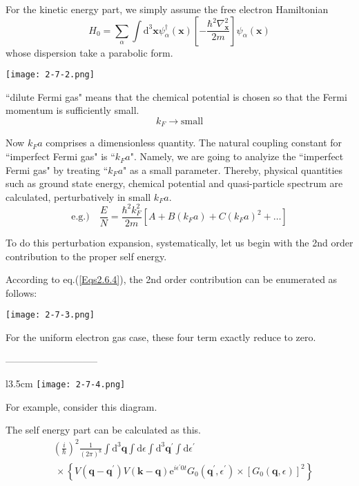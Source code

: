 For the kinetic energy part, we simply assume the free electron Hamiltonian
\[H_0 = \sum_\alpha \int \mathrm{d}^3 \mathbf{x} \psi_\alpha^\dagger (\mathbf{x}) \left[-\frac{\hbar^2\nabla^2_{\mathbf{x}}}{2m}\right]\psi_\alpha(\mathbf{x})\]
whose dispersion take a parabolic form.
\begin{center} \label{Fig2.7.2} \texttt{[image: 2-7-2.png]} \end{center}

``dilute Fermi gas" means that the chemical potential is chosen so that the Fermi momentum is sufficiently small. $$k_F \rightarrow \text{small}$$

Now $k_F a$ comprises a dimensionless quantity. The natural coupling constant for ``imperfect Fermi gas" is ``$k_F a$". Namely, we are going to analyize the ``imperfect Fermi gas" by treating ``$k_F a$" as a small parameter. Thereby, physical quantities such as ground state energy, chemical potential and quasi-particle spectrum are calculated, perturbatively in small $k_F a$.
\[ \text{e.g.)} \quad \frac{E}{N} = \frac{\hbar^2 k_F^2}{2m} \left[ A + B(k_F a) + C{(k_F a)}^2 + \ldots \right] \]

To do this perturbation expansion, systematically, let us begin with the 2nd order contribution to the proper self energy.

According to eq.(\ref{Eqs2.6.4}), the 2nd order contribution can be enumerated as follows:
\begin{center}\label{Fig2.7.3} \texttt{[image: 2-7-3.png]} \end{center}

For the uniform electron gas case, these four term exactly reduce to zero.
\begin{center}-----------------------------\end{center}

\begin{wrapfigure}{l}{3.5cm}
\label{Fig2.7.4} \texttt{[image: 2-7-4.png]}
\end{wrapfigure}
For example, consider this diagram.

The self energy part can be calculated as this.
\[ \begin{split} & {\left(\frac{i}{\hbar} \right)}^2 \frac{1}{\left( 2\pi \right)^8} \int \mathrm{d}^3 \mathbf{q} \int \mathrm{d}\epsilon \int \mathrm{d}^3 \mathbf{q}^{'} \int \mathrm{d} \epsilon^{'} \\
& \  \times \left\{ V(\mathbf{q}-\mathbf{q}^{'})V(\mathbf{k}-\mathbf{q})\mathrm{e}^{i \epsilon^{'} 0 t} G_0(\mathbf{q}^{'},\epsilon^{'}) \times \left[ G_0(\mathbf{q},\epsilon) \right]^2 \right \} \end{split} \]

